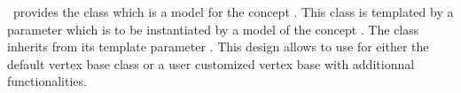 \cgal\ provides the class 
which is a model for the concept 
.
This class is templated by a parameter 
which is to be instantiated by a model of  the concept
.
The class  inherits
from its template parameter .
This design allows to use for   
either the default
vertex base class or a user customized
vertex base with additionnal functionalities.












